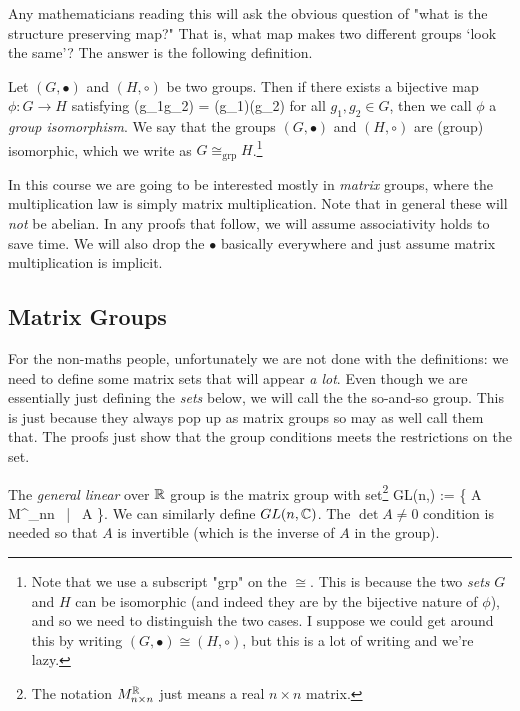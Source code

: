Any mathematicians reading this will ask the obvious question of "what is the structure preserving map?" That is, what map makes two different groups `look the same'? The answer is the following definition. 

    Let $(G,\bullet)$ and $(H,\circ)$ be two groups. Then if there exists a bijective map $\phi: G \to H$ satisfying 
    \bse 
        \phi(g_1\bullet g_2) = \phi(g_1)\circ \phi(g_2)
    \ese 
    for all $g_1,g_2\in G$, then we call $\phi$ a \textit{group isomorphism}. We say that the groups $(G,\bullet)$ and $(H,\circ)$ are (group) isomorphic, which we write as $G\cong_{\text{grp}} H$.\footnote{Note that we use a subscript "grp" on the $\cong$. This is because the two \textit{sets} $G$ and $H$ can be isomorphic (and indeed they are by the bijective nature of $\phi$), and so we need to distinguish the two cases. I suppose we could get around this by writing $(G,\bullet)\cong(H,\circ)$, but this is a lot of writing and we're lazy.}
\ed 


In this course we are going to be interested mostly in \textit{matrix} groups, where the multiplication law is simply matrix multiplication. Note that in general these will \textit{not} be abelian. In any proofs that follow, we will assume associativity holds to save time. We will also drop the $\bullet$ basically everywhere and just assume matrix multiplication is implicit. 

\subsection{Matrix Groups}

For the non-maths people, unfortunately we are not done with the definitions: we need to define some matrix sets that will appear \textit{a lot}. Even though we are essentially just defining the \textit{sets} below, we will call the the so-and-so group. This is just because they always pop up as matrix groups so may as well call them that. The proofs just show that the group conditions meets the restrictions on the set.

    The \textit{general linear} over $\mathbb{R}$ group is the matrix group with set\footnote{The notation $M^{\mathbb{R}}_{n\times n}$ just means a real $n\times n$ matrix.} 
    \bse 
        GL(n,\R) := \big\{ A \in M^{\R}_{n\times n} \, | \, \det A  \big\}.
    \ese 
    We can similarly define $GL(n,\mathbb{C})$. The $\det A \neq 0$ condition is needed so that $A$ is invertible (which is the inverse of $A$ in the group).
\ed 

